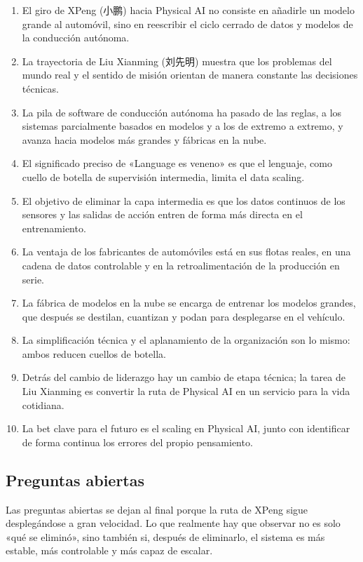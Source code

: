 \documentclass[a4paper]{article}
\begin{document}
\begin{enumerate}
\item El giro de XPeng (小鹏) hacia Physical AI no consiste en añadirle un modelo grande al automóvil, sino en reescribir el ciclo cerrado de datos y modelos de la conducción autónoma.
\item La trayectoria de Liu Xianming (刘先明) muestra que los problemas del mundo real y el sentido de misión orientan de manera constante las decisiones técnicas.
\item La pila de software de conducción autónoma ha pasado de las reglas, a los sistemas parcialmente basados en modelos y a los de extremo a extremo, y avanza hacia modelos más grandes y fábricas en la nube.
\item El significado preciso de «Language es veneno» es que el lenguaje, como cuello de botella de supervisión intermedia, limita el data scaling.
\item El objetivo de eliminar la capa intermedia es que los datos continuos de los sensores y las salidas de acción entren de forma más directa en el entrenamiento.
\item La ventaja de los fabricantes de automóviles está en sus flotas reales, en una cadena de datos controlable y en la retroalimentación de la producción en serie.
\item La fábrica de modelos en la nube se encarga de entrenar los modelos grandes, que después se destilan, cuantizan y podan para desplegarse en el vehículo.
\item La simplificación técnica y el aplanamiento de la organización son lo mismo: ambos reducen cuellos de botella.
\item Detrás del cambio de liderazgo hay un cambio de etapa técnica; la tarea de Liu Xianming es convertir la ruta de Physical AI en un servicio para la vida cotidiana.
\item La bet clave para el futuro es el scaling en Physical AI, junto con identificar de forma continua los errores del propio pensamiento.
\end{enumerate}

\subsection{Preguntas abiertas}

Las preguntas abiertas se dejan al final porque la ruta de XPeng sigue desplegándose a gran velocidad. Lo que realmente hay que observar no es solo «qué se eliminó», sino también si, después de eliminarlo, el sistema es más estable, más controlable y más capaz de escalar.
\end{document}
